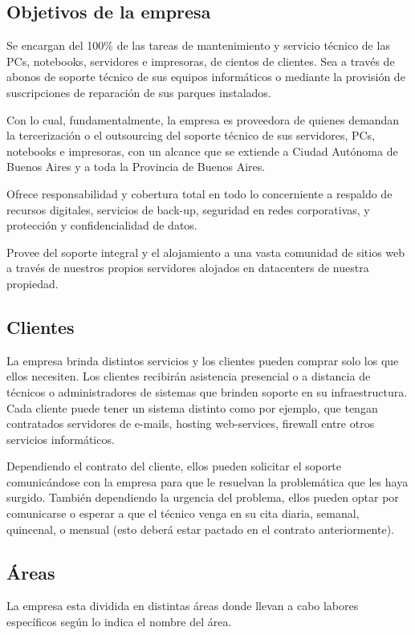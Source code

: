 \documentclass[12pt,a4paper]{article}
\begin{document}
\subsection{Objetivos de la empresa}
Se encargan del 100\% de las tareas de mantenimiento y servicio técnico de las PCs, notebooks, servidores e impresoras, de cientos de clientes. Sea a través de abonos de soporte técnico de sus equipos informáticos o mediante la provisión de suscripciones de reparación de sus parques instalados.

Con lo cual, fundamentalmente, la empresa es proveedora de quienes demandan la tercerización o el outsourcing del soporte técnico de sus servidores, PCs, notebooks e impresoras, con un alcance que se extiende a Ciudad Autónoma de Buenos Aires y a toda la Provincia de Buenos Aires.

Ofrece responsabilidad y cobertura total en todo lo concerniente a respaldo de recursos digitales, servicios de back-up, seguridad en redes corporativas, y protección y confidencialidad de datos.

Provee del soporte integral y el alojamiento a una vasta comunidad de sitios web a través de nuestros propios servidores alojados en datacenters de nuestra propiedad.

\subsection{Clientes}
La empresa brinda distintos servicios y los clientes pueden comprar solo los que ellos necesiten. Los clientes recibirán asistencia presencial o a distancia de técnicos o administradores de sistemas que brinden soporte en su infraestructura. Cada cliente puede tener un sistema distinto como por ejemplo, que tengan contratados servidores de e-mails, hosting web-services, firewall entre otros servicios informáticos.

Dependiendo el contrato del cliente, ellos pueden solicitar el soporte comunicándose con la empresa para que le resuelvan la problemática que les haya surgido. También dependiendo la urgencia del problema, ellos pueden optar por comunicarse o esperar a que el técnico venga en su cita diaria, semanal, quincenal, o mensual (esto deberá estar pactado en el contrato anteriormente).

\subsection{Áreas}
La empresa esta dividida en distintas áreas donde llevan a cabo labores específicos según lo indica el nombre del área.
\end{document}
